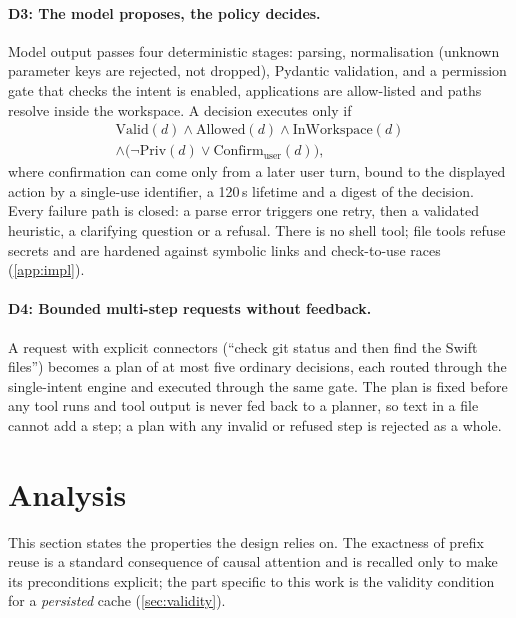 \documentclass[10pt,twocolumn,letterpaper]{article}
\theoremstyle{definition}
\begin{document}
\paragraph{D3: The model proposes, the policy decides.}\label{sec:safety}
Model output passes four deterministic stages: parsing, normalisation (unknown parameter keys are
rejected, not dropped), Pydantic validation, and a permission gate that checks the intent is
enabled, applications are allow-listed and paths resolve inside the workspace. A decision executes
only if
\begin{multline*}
\mathrm{Valid}(d)\wedge\mathrm{Allowed}(d)\wedge\mathrm{InWorkspace}(d)\\
\wedge\big(\neg\mathrm{Priv}(d)\vee\mathrm{Confirm}_{\text{user}}(d)\big),
\end{multline*}
where confirmation can come only from a later user turn, bound to the displayed action by a
single-use identifier, a 120\,s lifetime and a digest of the decision. Every failure path is closed:
a parse error triggers one retry, then a validated heuristic, a clarifying question or a refusal.
There is no shell tool; file tools refuse secrets and are hardened against symbolic links and
check-to-use races (\cref{app:impl}).

\paragraph{D4: Bounded multi-step requests without feedback.}\label{sec:agent}
A request with explicit connectors (``check git status and then find the Swift files'') becomes a
plan of at most five ordinary decisions, each routed through the single-intent engine and executed
through the same gate. The plan is fixed before any tool runs and tool output is never fed back to a
planner, so text in a file cannot add a step; a plan with any invalid or refused step is rejected as
a whole.

\section{Analysis}\label{sec:theory}

This section states the properties the design relies on. The exactness of prefix reuse is a
standard consequence of causal attention and is recalled only to make its preconditions explicit;
the part specific to this work is the validity condition for a \emph{persisted} cache
(\cref{sec:validity}).
\end{document}
